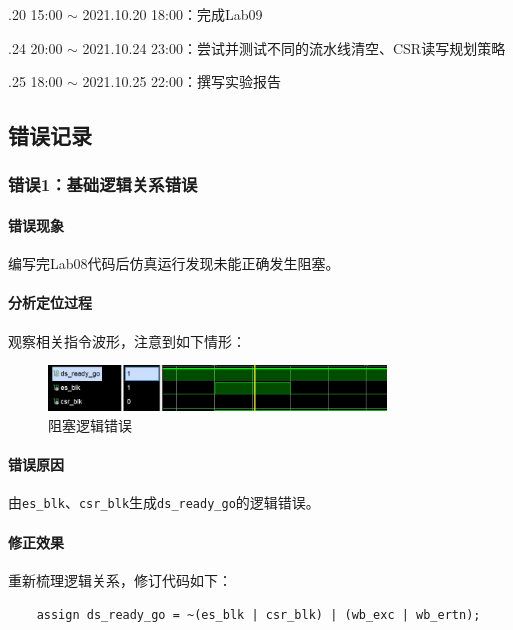 \documentclass[UTF-8,twoside,cs4size]{ctexart}
\begin{document}
    .20 15:00 $\sim$ 2021.10.20 18:00：完成Lab09
    
    .24 20:00 $\sim$ 2021.10.24 23:00：尝试并测试不同的流水线清空、CSR读写规划策略
    
    .25 18:00 $\sim$ 2021.10.25 22:00：撰写实验报告
	
	\subsection{错误记录}
    \subsubsection{错误\textbf{1：}基础逻辑关系错误}
    \paragraph{错误现象}\hfill
    
    编写完Lab08代码后仿真运行发现未能正确发生阻塞。
    
    \paragraph{分析定位过程}\hfill
    
    观察相关指令波形，注意到如下情形：
    \begin{figure}[!h]
        \centering
        \includegraphics[width=0.8\textwidth]{08-dbg-01.jpg}
        \caption{阻塞逻辑错误}
    \end{figure}
        
    \paragraph{错误原因}\hfill
    
    由\texttt{es\_blk}、\texttt{csr\_blk}生成\texttt{ds\_ready\_go}的逻辑错误。
    
    \paragraph{修正效果}\hfill
    
    重新梳理逻辑关系，修订代码如下：
    \begin{verbatim}
    assign ds_ready_go = ~(es_blk | csr_blk) | (wb_exc | wb_ertn);
    \end{verbatim}
	
\end{document}
